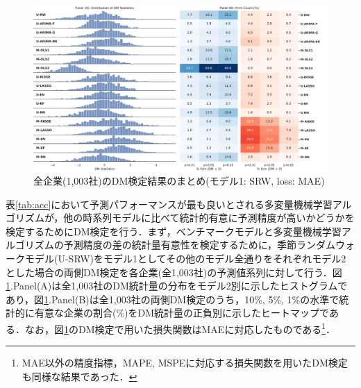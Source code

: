 \documentclass[a4paper，12pt]{jsarticle}
\begin{document}
\begin{figure}
  \centering
  \caption{全企業(1,003社)のDM検定結果のまとめ(モデル1: SRW, loss: MAE)}
  \label{fig:dm_srw}
  \includegraphics[width=15cm]{./img/_dm_MAD_y_hat_srw.pdf}
  
\end{figure}


表\ref{tab:acc}において予測パフォーマンスが最も良いとされる多変量機械学習アルゴリズムが，他の時系列モデルに比べて統計的有意に予測精度が高いかどうかを検定するためにDM検定を行う．まず，ベンチマークモデルと多変量機械学習アルゴリズムの予測精度の差の統計量有意性を検定するために，季節ランダムウォークモデル(U-SRW)をモデル1としてその他のモデル全通りをそれぞれモデル2とした場合の両側DM検定を各企業(全1,003社)の予測値系列に対して行う．図\ref{fig:dm_srw}.Panel(A)は全1,003社のDM統計量の分布をモデル2別に示したヒストグラムであり，図\ref{fig:dm_srw}.Panel(B)は全1,003社の両側DM検定のうち，10\%, 5\%, 1\%の水準で統計的に有意な企業の割合(\%)をDM統計量の正負別に示したヒートマップである．なお，図\ref{fig:dm_srw}のDM検定で用いた損失関数はMAEに対応したものである\footnote{MAE以外の精度指標，MAPE, MSPEに対応する損失関数を用いたDM検定も同様な結果であった．}．
\end{document}
